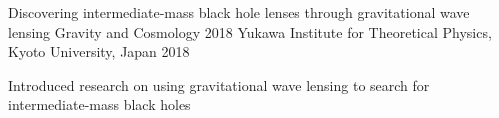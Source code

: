 \begin{cventries}
%
  \cventry
    {Discovering intermediate‑mass black hole lenses through gravitational wave lensing} %
    {Gravity and Cosmology 2018} %
    {Yukawa Institute for Theoretical Physics, Kyoto University, Japan} %
    {2018} %
    {
      \begin{cvitems} %
        \item {Introduced research on using gravitational wave lensing to search for intermediate-mass black holes}
      \end{cvitems}
    }

%
\end{cventries}
